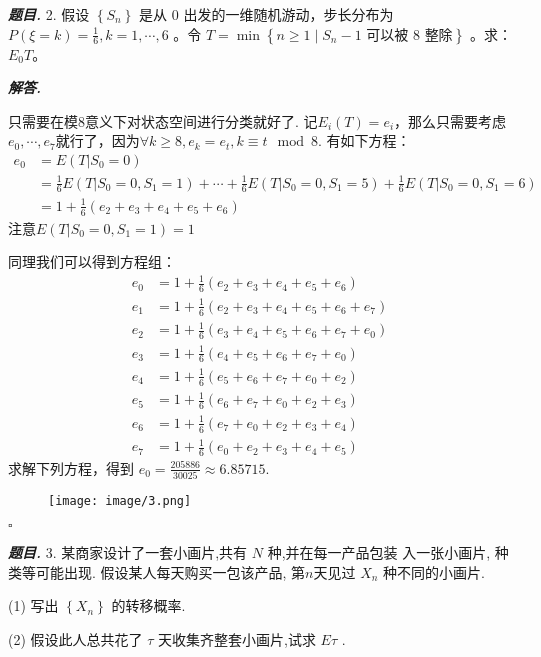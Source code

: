 \documentclass[10pt, a4paper, oneside]{ctexart}
\newenvironment{problem}{\begin{framed}\par\noindent\textbf{\textit{题目. }}}{\end{framed}\par}
\newenvironment{solution}{%
  \par\noindent\textbf{\textit{解答. }}\ignorespaces
}{%
  \hfill\ensuremath{\square}\par %
}
\begin{document}
\begin{problem}
    2. 假设 \(\left\{ S_n \right\}\) 是从 0 出发的一维随机游动，步长分布为 \(P(\xi = k) = \frac{1}{6}, k = 1, \cdots, 6\) 。令 \(T = \min \left\{ n \geq 1 \mid S_n - 1 \text{ 可以被 } 8 \text{ 整除} \right\}\) 。求：\({E}_0 T\)。
\end{problem}
\begin{solution}
    只需要在模$8$意义下对状态空间进行分类就好了. 记$E_i(T)=e_i$，那么只需要考虑$e_0,\cdots,e_7$就行了，因为$\forall k\geq 8, e_{k}=e_{t}, k\equiv t \mod 8$. 有如下方程：
    \begin{align*}
        e_0&=E(T|S_0=0)\\
        &=\frac{1}{6}E(T|S_0=0,S_1=1)+\cdots+\frac{1}{6}E(T|S_0=0,S_1=5)+\frac{1}{6}E(T|S_0=0,S_1=6)\\
        &=1+\frac{1}{6}(e_2+e_3+e_4+e_5+e_6)
    \end{align*}
    注意$E(T|S_0=0,S_1=1)=1$

    同理我们可以得到方程组：
    \begin{align*}
        e_0&=1+\frac{1}{6}(e_2+e_3+e_4+e_5+e_6)\\
        e_1&=1+\frac{1}{6}(e_2+e_3+e_4+e_5+e_6+e_7)\\
        e_2&=1+\frac{1}{6}(e_3+e_4+e_5+e_6+e_7+e_0)\\
        e_3&=1+\frac{1}{6}(e_4+e_5+e_6+e_7+e_0)\\
        e_4&=1+\frac{1}{6}(e_5+e_6+e_7+e_0+e_2)\\
        e_5&=1+\frac{1}{6}(e_6+e_7+e_0+e_2+e_3)\\
        e_6&=1+\frac{1}{6}(e_7+e_0+e_2+e_3+e_4)\\
        e_7&=1+\frac{1}{6}(e_0+e_2+e_3+e_4+e_5)
    \end{align*}
    求解下列方程，得到 $e_0=\frac{205886}{30025}\approx 6.85715$.
    \begin{figure}[h]
        \centering
        \texttt{[image: image/3.png]}
    \end{figure}
\end{solution}

\begin{problem}
    3. 某商家设计了一套小画片,共有 \( N \) 种,并在每一产品包装
入一张小画片, 种类等可能出现. 假设某人每天购买一包该产品, 第$n$天见过 \( {X}_{n} \) 种不同的小画片.

(1) 写出 \( \left\{  {X}_{n}\right\}   \) 的转移概率.

(2) 假设此人总共花了 \( \tau  \) 天收集齐整套小画片,试求 \( {E\tau } \) .
\end{problem}
\end{document}

